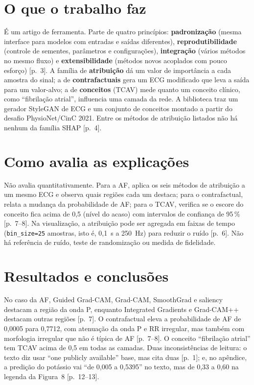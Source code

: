 \documentclass[11pt,a4paper]{article}
\begin{document}
\section{O que o trabalho faz}
É um artigo de ferramenta. Parte de quatro princípios: \textbf{padronização} (mesma interface para modelos com entradas e saídas diferentes), \textbf{reprodutibilidade} (controle de sementes, parâmetros e configurações), \textbf{integração} (vários métodos no mesmo fluxo) e \textbf{extensibilidade} (métodos novos acoplados com pouco esforço) [p.~3]. A família de \textbf{atribuição} dá um valor de importância a cada amostra do sinal; a de \textbf{contrafactuais} gera um ECG modificado que leva a saída para um valor-alvo; a de \textbf{conceitos} (TCAV) mede quanto um conceito clínico, como “fibrilação atrial”, influencia uma camada da rede. A biblioteca traz um gerador StyleGAN de ECG e um conjunto de conceitos montado a partir do desafio PhysioNet/CinC 2021. Entre os métodos de atribuição listados não há nenhum da família SHAP [p.~4].

\section{Como avalia as explicações}
Não avalia quantitativamente. Para a AF, aplica os seis métodos de atribuição a um mesmo ECG e observa quais regiões cada um destaca; para o contrafactual, relata a mudança da probabilidade de AF; para o TCAV, verifica se o escore do conceito fica acima de 0,5 (nível do acaso) com intervalos de confiança de 95\,\% [p.~7--8]. Na visualização, a atribuição pode ser agregada em faixas de tempo (\texttt{bin\_size=25} amostras, isto é, 0,1~s a 250~Hz) para reduzir o ruído [p.~6]. Não há referência de ruído, teste de randomização ou medida de fidelidade.

\section{Resultados e conclusões}
No caso da AF, Guided Grad-CAM, Grad-CAM, SmoothGrad e saliency destacam a região da onda P, enquanto Integrated Gradients e Grad-CAM++ destacam outras regiões [p.~7]. O contrafactual eleva a probabilidade de AF de 0,0005 para 0,7712, com atenuação da onda P e RR irregular, mas também com morfologia irregular que não é típica de AF [p.~7--8]. O conceito “fibrilação atrial” tem TCAV acima de 0,5 em todas as camadas. Duas inconsistências de leitura: o texto diz usar “one publicly available” base, mas cita duas [p.~1]; e, no apêndice, a predição do potássio vai “de 0,005 a 0,5395” no texto, mas de 0,33 a 0,60 na legenda da Figura~8 [p.~12--13].
\end{document}
